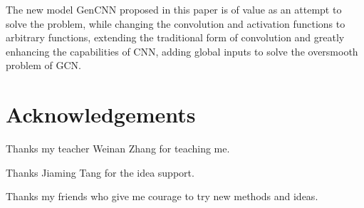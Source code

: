 \documentclass{article}
\begin{document}
The new model GenCNN proposed in this paper is of value as an attempt to solve the problem, 
while changing the convolution and activation functions to arbitrary functions, 
extending the traditional form of convolution and greatly enhancing the capabilities of CNN, 
adding global inputs to solve the oversmooth problem of GCN.


\section*{Acknowledgements}

Thanks my teacher Weinan Zhang for teaching me.

Thanks Jiaming Tang for the idea support.

Thanks my friends who give me courage to try new methods and ideas.

\medskip










\end{document}
